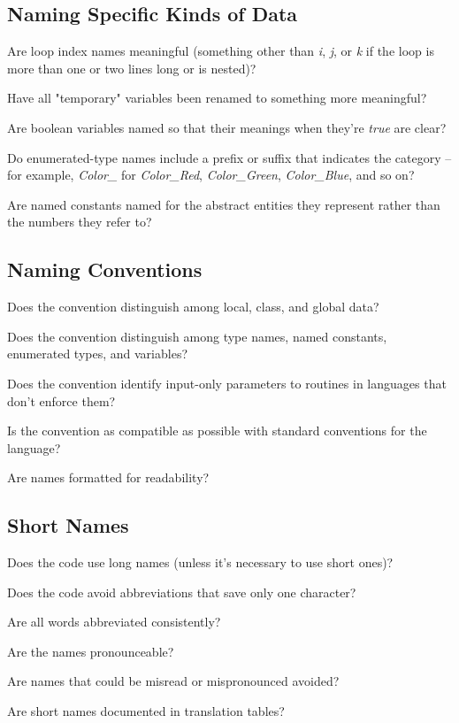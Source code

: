 \begin{multicols}{2}
\subsection*{Naming Specific Kinds of Data}
\begin{todolist}
  \item Are loop index names meaningful (something other than \textit{i}, \textit{j}, or \textit{k} if the loop is more than one or two lines long or is nested)?
  \item Have all "temporary" variables been renamed to something more meaningful?
  \item Are boolean variables named so that their meanings when they're \textit{true} are clear?
  \item Do enumerated-type names include a prefix or suffix that indicates the category -- for example, \textit{Color\_} for \textit{Color\_Red}, \textit{Color\_Green}, \textit{Color\_Blue}, and so on?
  \item Are named constants named for the abstract entities they represent rather than the numbers they refer to?
\end{todolist}

\subsection*{Naming Conventions}
\begin{todolist}
  \item Does the convention distinguish among local, class, and global data?
  \item Does the convention distinguish among type names, named constants, enumerated types, and variables?
  \item Does the convention identify input-only parameters to routines in languages that don't enforce them?
  \item Is the convention as compatible as possible with standard conventions for the language?
  \item Are names formatted for readability?
\end{todolist}

\subsection*{Short Names}
\begin{todolist}
  \item Does the code use long names (unless it's necessary to use short ones)?
  \item Does the code avoid abbreviations that save only one character?
  \item Are all words abbreviated consistently?
  \item Are the names pronounceable?
  \item Are names that could be misread or mispronounced avoided?
  \item Are short names documented in translation tables?
\end{todolist}


\end{multicols}

